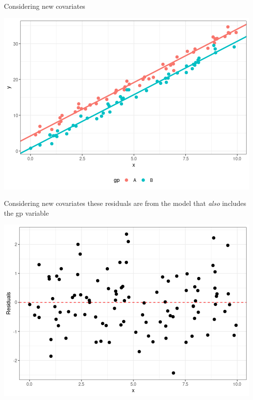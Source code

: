 \documentclass{beamer}
\begin{document}
\begin{frame}{Considering new covariates}
\begin{center}
\includegraphics[scale=0.5]{have_cat.png}
\end{center}
\end{frame}


\begin{frame}{Considering new covariates}
these residuals are from the model that \textit{also} includes the gp variable
\begin{center}
\includegraphics[scale=0.5]{have_cat1.png}
\end{center}
\end{frame}
\end{document}
